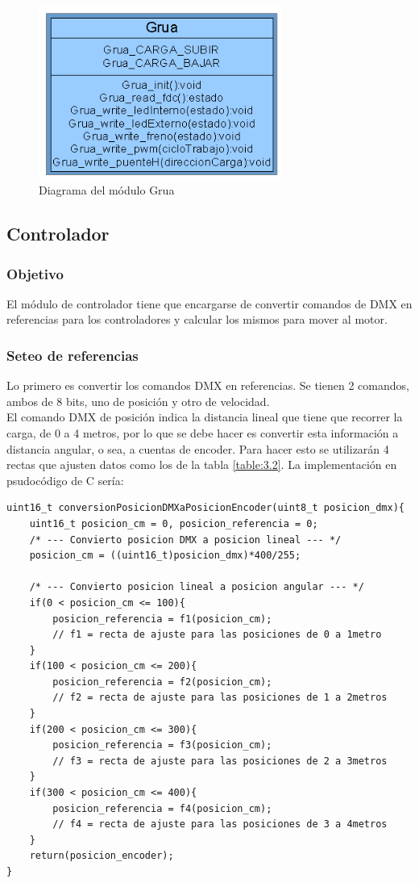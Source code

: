 \begin{figure}[!ht]
	\centering
	\includegraphics[width=8cm,scale=1]{resources/3_26-moduloGrua.png}
	\caption{Diagrama del módulo Grua}
	\label{fig:\thefigure}
\end{figure}

\subsection{Controlador}
\subsubsection{Objetivo}
El módulo de controlador tiene que encargarse de convertir comandos de DMX en referencias para los controladores y calcular los mismos para mover al motor.

\subsubsection{Seteo de referencias}
Lo primero es convertir los comandos DMX en referencias. Se tienen 2 comandos, ambos de 8 bits, uno de posición y otro de velocidad.\\
El comando DMX de posición indica la distancia lineal que tiene que recorrer la carga, de 0 a 4 metros, por lo que se debe hacer es convertir esta información a distancia angular, o sea, a cuentas de encoder. Para hacer esto se utilizarán 4 rectas que ajusten datos como los de la tabla \ref{table:3.2}. La implementación en psudocódigo de C sería:
\begin{lstlisting}[style=CStyle]
uint16_t conversionPosicionDMXaPosicionEncoder(uint8_t posicion_dmx){
	uint16_t posicion_cm = 0, posicion_referencia = 0;
	/* --- Convierto posicion DMX a posicion lineal --- */
	posicion_cm = ((uint16_t)posicion_dmx)*400/255;
	
	/* --- Convierto posicion lineal a posicion angular --- */
	if(0 < posicion_cm <= 100){
		posicion_referencia = f1(posicion_cm); 
		// f1 = recta de ajuste para las posiciones de 0 a 1metro
	}
	if(100 < posicion_cm <= 200){
		posicion_referencia = f2(posicion_cm); 
		// f2 = recta de ajuste para las posiciones de 1 a 2metros
	}
	if(200 < posicion_cm <= 300){
		posicion_referencia = f3(posicion_cm); 
		// f3 = recta de ajuste para las posiciones de 2 a 3metros
	}
	if(300 < posicion_cm <= 400){
		posicion_referencia = f4(posicion_cm); 
		// f4 = recta de ajuste para las posiciones de 3 a 4metros
	}
	return(posicion_encoder);
}
\end{lstlisting}

